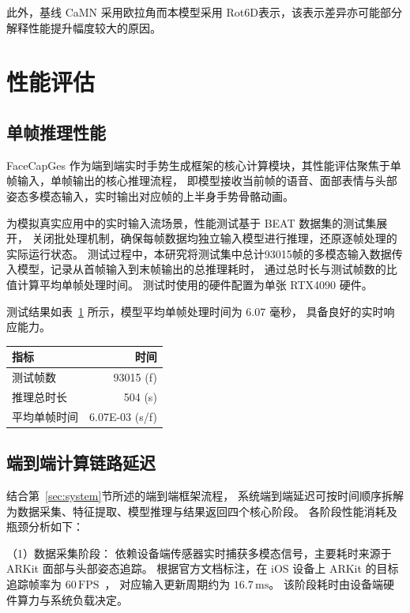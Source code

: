 此外，基线 CaMN 采用欧拉角而本模型采用 Rot6D\cite{rot6d}表示，该表示差异亦可能部分解释性能提升幅度较大的原因。

\section{性能评估}

\subsection{单帧推理性能}
\label{sec:performance_test}
FaceCapGes 作为端到端实时手势生成框架的核心计算模块，其性能评估聚焦于单帧输入，单帧输出的核心推理流程，
即模型接收当前帧的语音、面部表情与头部姿态多模态输入，实时输出对应帧的上半身手势骨骼动画。

为模拟真实应用中的实时输入流场景，性能测试基于 BEAT 数据集的测试集展开，
关闭批处理机制，确保每帧数据均独立输入模型进行推理，还原逐帧处理的实际运行状态。
测试过程中，本研究将测试集中总计93015帧的多模态输入数据传入模型，记录从首帧输入到末帧输出的总推理耗时，
通过总时长与测试帧数的比值计算平均单帧处理时间。
测试时使用的硬件配置为单张 RTX4090 硬件。

测试结果如表~\ref {tab3} 所示，模型平均单帧处理时间为 6.07 毫秒，
具备良好的实时响应能力。

\begin{table}[h]
\centering
\begin{tabular}{@{}lr@{}}
\hline
指标 & 时间 \\
\hline
测试帧数 & 93015 (f) \\
推理总时长 & 504 (s) \\
平均单帧时间 & 6.07E-03 (s/f) \\
\hline
\end{tabular}
\label{tab3}
\end{table}

\subsection{端到端计算链路延迟}
结合第~\ref{sec:system}节所述的端到端框架流程，
系统端到端延迟可按时间顺序拆解为数据采集、特征提取、模型推理与结果返回四个核心阶段。
各阶段性能消耗及瓶颈分析如下：

（1）数据采集阶段：
依赖设备端传感器实时捕获多模态信号，主要耗时来源于 ARKit 面部与头部姿态追踪。
根据官方文档标注，在 iOS 设备上 ARKit 的目标追踪帧率为 $60\,\mathrm{FPS}$~\cite{AppleARKitTrackingGuide}，
对应输入更新周期约为 $16.7\,\mathrm{ms}$。
该阶段耗时由设备端硬件算力与系统负载决定。

